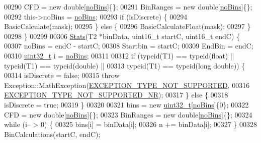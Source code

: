 \begin{DoxyCode}
00290     CFD = \textcolor{keyword}{new} \textcolor{keywordtype}{double}[\hyperlink{class_soil_math_1_1_stats_a4202c9085eacaff2e04eda84fc90e92b}{noBins}]\{\};
00291     BinRanges = \textcolor{keyword}{new} \textcolor{keywordtype}{double}[\hyperlink{class_soil_math_1_1_stats_a4202c9085eacaff2e04eda84fc90e92b}{noBins}]\{\};
00292     this->noBins = \hyperlink{class_soil_math_1_1_stats_a4202c9085eacaff2e04eda84fc90e92b}{noBins};
00293     \textcolor{keywordflow}{if} (isDiscrete) \{
00294       BasicCalculate(mask);
00295     \} \textcolor{keywordflow}{else} \{
00296       BasicCalculateFloat(mask);
00297     \}
00298   \}
00299 
00306   \hyperlink{class_soil_math_1_1_stats_aa9727b7ea39b46f8a010a7b710b26d83}{Stats}(T2 *binData, uint16\_t startC, uint16\_t endC) \{
00307     noBins = endC - startC;
00308     Startbin = startC;
00309     EndBin = endC;
00310     \hyperlink{_soil_math_types_8h_a435d1572bf3f880d55459d9805097f62}{uint32\_t} i = \hyperlink{class_soil_math_1_1_stats_a4202c9085eacaff2e04eda84fc90e92b}{noBins};
00311 
00312     \textcolor{keywordflow}{if} (\textcolor{keyword}{typeid}(T1) == \textcolor{keyword}{typeid}(\textcolor{keywordtype}{float}) || \textcolor{keyword}{typeid}(T1) == \textcolor{keyword}{typeid}(\textcolor{keywordtype}{double}) ||
00313         \textcolor{keyword}{typeid}(T1) == \textcolor{keyword}{typeid}(\textcolor{keywordtype}{long} \textcolor{keywordtype}{double})) \{
00314       isDiscrete = \textcolor{keyword}{false};
00315       \textcolor{keywordflow}{throw} Exception::MathException(\hyperlink{_math_exception_8h_a17c65ecafe069371fe919795d9680138}{EXCEPTION\_TYPE\_NOT\_SUPPORTED},
00316                                      \hyperlink{_math_exception_8h_acb96f1baa08302e9497abb62d8959960}{EXCEPTION\_TYPE\_NOT\_SUPPORTED\_NR});
00317     \} \textcolor{keywordflow}{else} \{
00318       isDiscrete = \textcolor{keyword}{true};
00319     \}
00320 
00321     bins = \textcolor{keyword}{new} \hyperlink{_soil_math_types_8h_a435d1572bf3f880d55459d9805097f62}{uint32\_t}[\hyperlink{class_soil_math_1_1_stats_a4202c9085eacaff2e04eda84fc90e92b}{noBins}]\{0\};
00322     CFD = \textcolor{keyword}{new} \textcolor{keywordtype}{double}[\hyperlink{class_soil_math_1_1_stats_a4202c9085eacaff2e04eda84fc90e92b}{noBins}]\{\};
00323     BinRanges = \textcolor{keyword}{new} \textcolor{keywordtype}{double}[\hyperlink{class_soil_math_1_1_stats_a4202c9085eacaff2e04eda84fc90e92b}{noBins}]\{\};
00324     \textcolor{keywordflow}{while} (i-- > 0) \{
00325       bins[i] = binData[i];
00326       n += binData[i];
00327     \}
00328     BinCalculations(startC, endC);

\end{DoxyCode}

